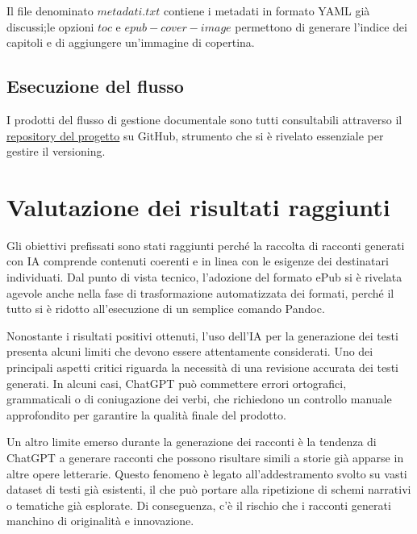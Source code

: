 \documentclass[a4paper,12pt]{article}
\begin{document}
\bigbreak

Il file denominato $metadati.txt$ contiene i metadati in formato YAML già discussi;le opzioni $toc$ e $epub-cover-image$ permettono di generare l'indice dei capitoli e di aggiungere un'immagine di copertina.


\subsection*{Esecuzione del flusso}
I prodotti del flusso di gestione documentale sono tutti consultabili attraverso il \href{https://github.com/gianlucapironato/editoria_digitale/}{\underline{repository del progetto}} su GitHub, strumento che si è rivelato essenziale per gestire il versioning. 



\section*{Valutazione dei risultati raggiunti}

Gli obiettivi prefissati sono stati raggiunti perché la raccolta di racconti generati con IA comprende contenuti coerenti e in linea con le esigenze dei destinatari individuati. Dal punto di vista tecnico, l'adozione del formato ePub si è rivelata agevole anche nella fase di trasformazione automatizzata dei formati, perché il tutto si è ridotto all'esecuzione di un semplice comando Pandoc. 

\bigbreak

Nonostante i risultati positivi ottenuti, l'uso dell'IA per la generazione dei testi presenta alcuni limiti che devono essere attentamente considerati. Uno dei principali aspetti critici riguarda la necessità di una revisione accurata dei testi generati. In alcuni casi, ChatGPT può commettere errori ortografici, grammaticali o di coniugazione dei verbi, che richiedono un controllo manuale approfondito per garantire la qualità finale del prodotto.

\bigbreak

Un altro limite emerso durante la generazione dei racconti è la tendenza di ChatGPT a generare racconti che possono risultare simili a storie già apparse in altre opere letterarie. Questo fenomeno è legato all'addestramento svolto su vasti dataset di testi già esistenti, il che può portare alla ripetizione di schemi narrativi o tematiche già esplorate. Di conseguenza, c'è il rischio che i racconti generati manchino di originalità e innovazione.
\end{document}
